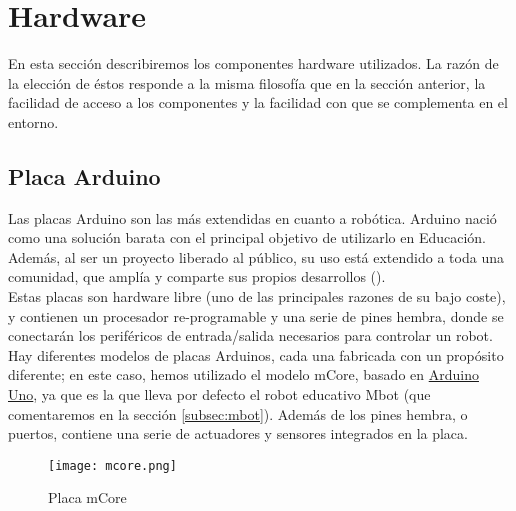 \section{Hardware}\label{sec:hardware}
En esta sección describiremos los componentes hardware utilizados. La razón de la elección de éstos responde a la misma filosofía que en la sección anterior, la facilidad de acceso a los componentes y la facilidad con que se complementa en el entorno.
\subsection{Placa Arduino}\label{subsec:placaBase}
Las placas Arduino son las más extendidas en cuanto a robótica. Arduino nació como una solución barata con el principal objetivo de utilizarlo en Educación. Además, al ser un proyecto liberado al público, su uso está extendido a toda una comunidad, que amplía y comparte sus propios desarrollos (\cite{arduinoURL}).\\
Estas placas son hardware libre (uno de las principales razones de su bajo coste), y contienen un procesador re-programable y una serie de pines hembra, donde se conectarán los periféricos de entrada/salida necesarios para controlar un robot. Hay diferentes modelos de placas Arduinos, cada una fabricada con un propósito diferente; en este caso, hemos utilizado el modelo mCore, basado en \href{https://arduino.cl/producto/arduino-uno/}{Arduino Uno}, ya que es la que lleva por defecto el robot educativo Mbot (que comentaremos en la sección \ref{subsec:mbot}). Además de los pines hembra, o puertos, contiene una serie de actuadores y sensores integrados en la placa.
\begin{figure}[H]
		\texttt{[image: mcore.png]}\centering
	\label{img:Mcore}
	\caption{Placa mCore}
\end{figure}
